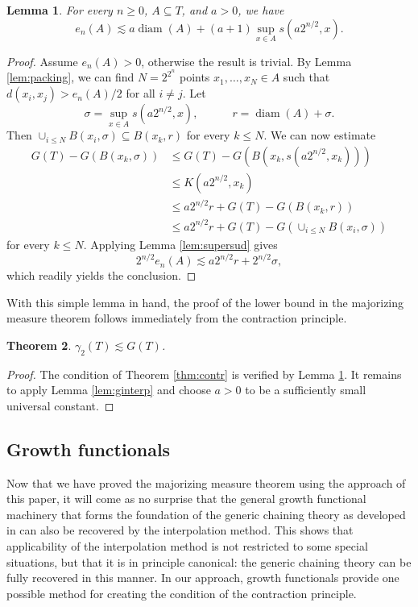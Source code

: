 \documentclass[10pt,reqno]{amsart}
\newtheorem{thm}{Theorem}[section]
\newtheorem{lem}[thm]{Lemma}
\theoremstyle{definition}
\numberwithin{equation}{section}
\numberwithin{figure}{section}
\numberwithin{table}{section}
\newcommand{\diam}{\mathop{\mathrm{diam}}}
\begin{document}
\begin{lem}
\label{lem:gausscontr}
For every $n\ge 0$, $A\subseteq T$, and $a>0$, we have
$$
	e_n(A) \lesssim a\diam(A) + (a+1)\sup_{x\in A}s(a2^{n/2},x).
$$
\end{lem}

\begin{proof}
Assume $e_n(A)>0$, otherwise the result is trivial.
By Lemma \ref{lem:packing}, we can find $N=2^{2^n}$ points
$x_1,\ldots,x_N\in A$ such that $d(x_i,x_j)>e_n(A)/2$ for all $i\ne j$.
Let
$$
	\sigma = \sup_{x\in A}s(a2^{n/2},x),\qquad\quad
	r = \diam(A)+\sigma.
$$
Then $\cup_{i\le N}B(x_i,\sigma)\subseteq B(x_k,r)$ for every $k\le N$. We 
can now estimate
\begin{align*}
	G(T) - G(B(x_k,\sigma)) &\le
	G(T) - G(B(x_k,s(a2^{n/2},x_k))) \\ &\le
	K(a2^{n/2},x_k) \\
	&\le a2^{n/2}r + G(T) - G(B(x_k,r)) \\
	&\le a2^{n/2}r + G(T) - G(\cup_{i\le N}B(x_i,\sigma))
\end{align*}
for every $k\le N$. Applying Lemma \ref{lem:supersud} gives
$$
	2^{n/2}e_n(A) \lesssim
	a2^{n/2}r + 2^{n/2}\sigma,
$$
which readily yields the conclusion.
\end{proof}

With this simple lemma in hand, the proof of the lower bound in the 
majorizing measure theorem follows immediately from the contraction 
principle.

\begin{thm}
$\gamma_2(T)\lesssim G(T)$.
\end{thm}

\begin{proof}
The condition of Theorem \ref{thm:contr} is verified by Lemma 
\ref{lem:gausscontr}. It remains to apply Lemma \ref{lem:ginterp} and
choose $a>0$ to be a sufficiently small universal constant.
\end{proof}


\subsection{Growth functionals}
\label{sec:growth}

Now that we have proved the majorizing measure theorem using the approach 
of this paper, it will come as no surprise that the general growth 
functional machinery that forms the foundation of the generic chaining 
theory as developed in \cite{Tal14} can also be recovered by the 
interpolation method. This shows that applicability of the interpolation 
method is not restricted to some special situations, but that it is in 
principle canonical: the generic chaining theory can be fully recovered in 
this manner. In our approach, growth functionals provide one possible 
method for creating the condition of the contraction principle.
\end{document}
